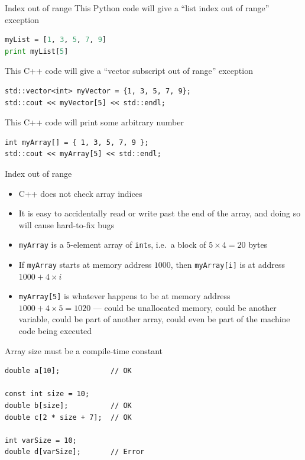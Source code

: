 \begin{frame}[fragile]{Index out of range}
    This Python code will give a ``list index out of range'' exception
    \begin{lstlisting}[language=Python]
myList = [1, 3, 5, 7, 9]
print myList[5]
    \end{lstlisting}
    
    This C++ code will give a ``vector subscript out of range'' exception
    \begin{lstlisting}
std::vector<int> myVector = {1, 3, 5, 7, 9};
std::cout << myVector[5] << std::endl;
    \end{lstlisting}
    
    This C++ code will print some arbitrary number
    \begin{lstlisting}
int myArray[] = { 1, 3, 5, 7, 9 };
std::cout << myArray[5] << std::endl;
    \end{lstlisting}
\end{frame}

\begin{frame}[fragile]{Index out of range}
    \begin{itemize}
        \item C++ does not check array indices
        \item It is easy to accidentally read or write past the end of the array, and doing so will cause
            hard-to-fix bugs
        \item \lstinline{myArray} is a 5-element array of \lstinline{int}s, i.e.\ a block of $5 \times 4 = 20$ bytes
        \item If \lstinline{myArray} starts at memory address $1000$, then \lstinline{myArray[i]} is at address
            $1000 + 4 \times i$
        \item \lstinline{myArray[5]} is whatever happens to be at memory address $1000 + 4 \times 5 = 1020$ ---
            could be unallocated memory, could be another variable, could be part of another array,
            could even be part of the machine code being executed
    \end{itemize}
\end{frame}

\begin{frame}[fragile]{Array size must be a compile-time constant}
    \begin{lstlisting}
double a[10];            // OK

const int size = 10;
double b[size];          // OK
double c[2 * size + 7];  // OK

int varSize = 10;
double d[varSize];       // Error
    \end{lstlisting}
\end{frame}

